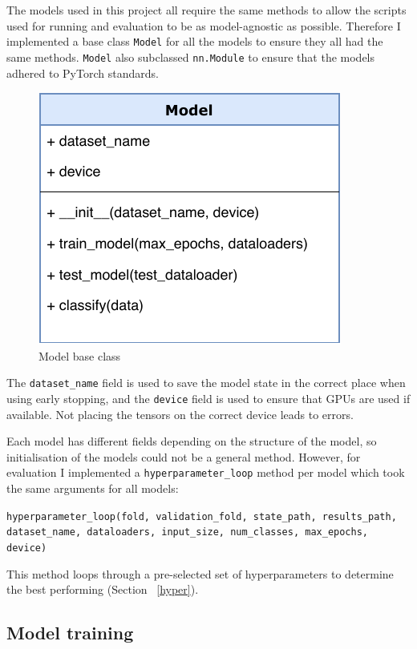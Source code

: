 The models used in this project all require the same methods to allow the scripts used for running and evaluation to be as 
model-agnostic as possible. Therefore I implemented a base class \texttt{Model} for all the models to ensure they all had the same methods.
\texttt{Model} also subclassed \texttt{nn.Module} to ensure that the models adhered to PyTorch standards.
\begin{figure}[H]
  \centering
  \includegraphics[scale=0.75]{figs/model_class.pdf}
  \caption{Model base class}
\end{figure}

The \texttt{dataset\_name} field is used to save the model state in the correct place when using early stopping, and the \texttt{device} field is 
used to ensure that GPUs are used if available. Not placing the tensors on the correct device 
leads to errors.

Each model has different fields depending on the structure of the model, so initialisation of the models could not be a general method. 
However, for evaluation I implemented a \texttt{hyperparameter\_loop} method per model 
which took the same arguments for all models:
\begin{center}
  \texttt{hyperparameter\_loop(fold, validation\_fold, state\_path, results\_path, dataset\_name, dataloaders, input\_size, num\_classes, max\_epochs, device)}
\end{center}

This method loops through a pre-selected set of hyperparameters to determine the best performing (Section ~\ref{hyper}).

\subsection{Model training}

